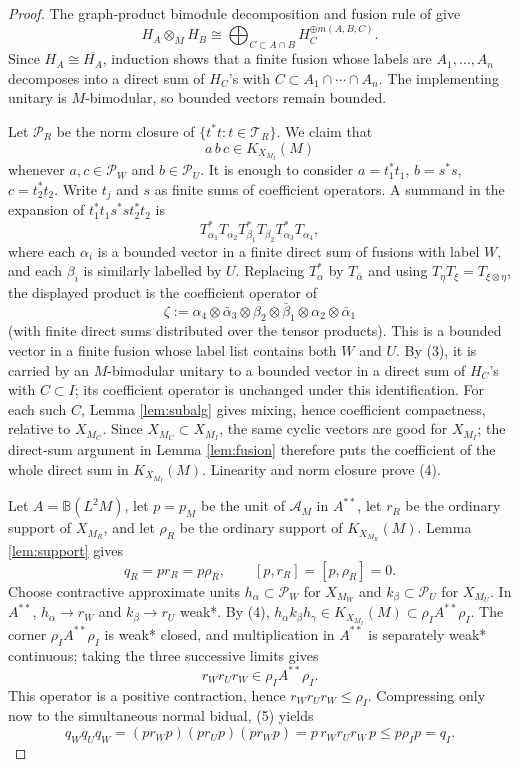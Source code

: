 \documentclass[12pt]{article}
\newcommand{\cA}{\mathcal A}
\newcommand{\cT}{\mathcal T}
\begin{document}
\begin{proof}
The graph-product bimodule decomposition and fusion rule of
\cite[Theorem 5.4 and Proposition 5.5]{CDHJKN} give
\[
        H_A\otimes_M H_B\cong
        \bigoplus_{C\subset A\cap B}H_C^{\oplus m(A,B,C)} .        \tag{3}
\]
Since \(H_A\cong\overline{H_A}\), induction shows that a finite fusion whose
labels are \(A_1,\ldots,A_n\) decomposes into a direct sum of \(H_C\)'s with
\(C\subset A_1\cap\cdots\cap A_n\).  The implementing unitary is
\(M\)-bimodular, so bounded vectors remain bounded.

Let \(\mathcal P_R\) be the norm closure of \(\{t^*t:t\in\cT_R\}\).  We claim
that
\[
        a\,b\,c\in K_{X_{M_I}}(M)             \tag{4}
\]
whenever \(a,c\in\mathcal P_W\) and \(b\in\mathcal P_U\).  It is enough to
consider \(a=t_1^*t_1\), \(b=s^*s\), \(c=t_2^*t_2\).  Write
\(t_j\) and \(s\) as finite sums of coefficient operators.  A summand in the
expansion of \(t_1^*t_1s^*st_2^*t_2\) is
\[
T_{\alpha_1}^*T_{\alpha_2}T_{\beta_1}^*T_{\beta_2}
T_{\alpha_3}^*T_{\alpha_4},
\]
where each \(\alpha_i\) is a bounded vector in a finite direct sum of fusions
with label \(W\), and each \(\beta_i\) is similarly labelled by \(U\).  Replacing
\(T_\alpha^*\) by \(T_{\bar\alpha}\) and using
\(T_\eta T_\xi=T_{\xi\otimes\eta}\), the displayed product is the coefficient
operator of
\[
 \zeta:=\alpha_4\otimes\bar\alpha_3\otimes\beta_2\otimes\bar\beta_1
 \otimes\alpha_2\otimes\bar\alpha_1
\]
(with finite direct sums distributed over the tensor products).  This is a
bounded vector in a finite fusion whose label list contains both \(W\) and
\(U\).  By (3), it is carried by an \(M\)-bimodular unitary to a bounded vector
in a direct sum of \(H_C\)'s with \(C\subset I\); its coefficient operator is
unchanged under this identification.  For each such \(C\), Lemma
\ref{lem:subalg} gives mixing, hence coefficient compactness, relative to
\(X_{M_C}\).  Since \(X_{M_C}\subset X_{M_I}\), the same cyclic vectors are good
for \(X_{M_I}\); the direct-sum argument in Lemma \ref{lem:fusion} therefore
puts the coefficient of the whole direct sum in \(K_{X_{M_I}}(M)\).  Linearity
and norm closure prove (4).

Let \(A=\mathbb B(L^2M)\), let \(p=p_M\) be the unit of \(\cA_M\) in
\(A^{**}\), let \(r_R\) be the ordinary support of \(X_{M_R}\), and let
\(\rho_R\) be the ordinary support of \(K_{X_{M_R}}(M)\).  Lemma
\ref{lem:support} gives
\[
        q_R=pr_R=p\rho_R,\qquad [p,r_R]=[p,\rho_R]=0 .              \tag{5}
\]
Choose contractive approximate units
\(h_\alpha\subset\mathcal P_W\) for \(X_{M_W}\) and
\(k_\beta\subset\mathcal P_U\) for \(X_{M_U}\).  In \(A^{**}\),
\(h_\alpha\to r_W\) and \(k_\beta\to r_U\) weak*.  By (4),
\(h_\alpha k_\beta h_\gamma\in K_{X_{M_I}}(M)\subset
\rho_IA^{**}\rho_I\).  The corner \(\rho_IA^{**}\rho_I\) is weak* closed, and
multiplication in \(A^{**}\) is separately weak* continuous; taking the three
successive limits gives
\[
        r_W r_U r_W\in \rho_I A^{**}\rho_I .
\]
This operator is a positive contraction, hence \(r_Wr_Ur_W\le \rho_I\).
Compressing only now to the simultaneous normal bidual, (5) yields
\[
 q_Wq_Uq_W
 =(pr_Wp)(pr_Up)(pr_Wp)
 =p\,r_Wr_Ur_W\,p
 \le p\rho_Ip=q_I .
\]


\end{proof}
\end{document}
